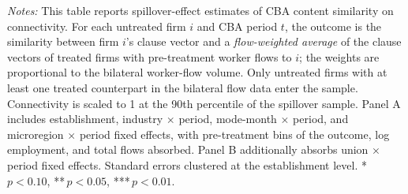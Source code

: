 \begin{table}[H]
\begin{minipage}{\linewidth}
\smallskip
\scriptsize\textit{Notes:} This table reports spillover-effect estimates of CBA content similarity on connectivity. For each untreated firm $i$ and CBA period $t$, the outcome is the similarity between firm $i$'s clause vector and a \emph{flow-weighted average} of the clause vectors of treated firms with pre-treatment worker flows to $i$; the weights are proportional to the bilateral worker-flow volume. Only untreated firms with at least one treated counterpart in the bilateral flow data enter the sample. Connectivity is scaled to 1 at the 90th percentile of the spillover sample. Panel A includes establishment, industry $\times$ period, mode-month $\times$ period, and microregion $\times$ period fixed effects, with pre-treatment bins of the outcome, log employment, and total flows absorbed. Panel B additionally absorbs union $\times$ period fixed effects. Standard errors clustered at the establishment level. *\,$p<0.10$, **\,$p<0.05$, ***\,$p<0.01$.
\end{minipage}
\end{table}
